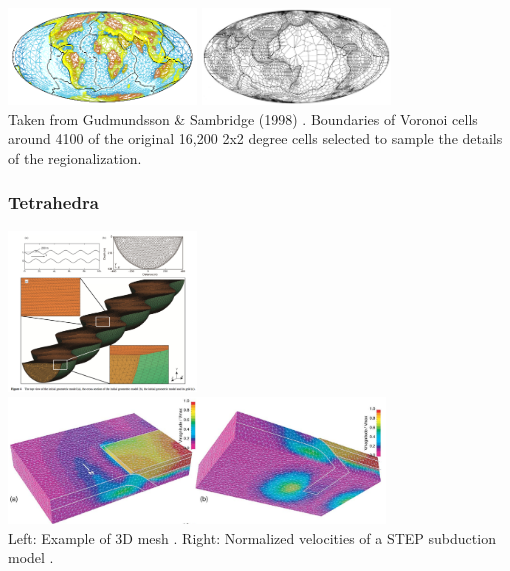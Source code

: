 
\begin{center}
\includegraphics[width=5cm]{images/meshes/gusa98a}
\includegraphics[width=5cm]{images/meshes/gusa98b}\\
{\captionfont Taken from Gudmundsson \& Sambridge (1998) \cite{gusa98}.
Boundaries of Voronoi cells around 4100 of the original 16,200 2x2 degree cells
selected to sample the details of the regionalization.}
\end{center}


\subsubsection{Tetrahedra}

\begin{center}
\includegraphics[width=5cm]{images/meshes/glacier}
\includegraphics[width=10cm]{images/meshes/gowo05}\\
{\captionfont Left: Example of 3D mesh \cite{yash15}.
Right: Normalized velocities of a STEP subduction model \cite{gowo05}.}
\end{center}


